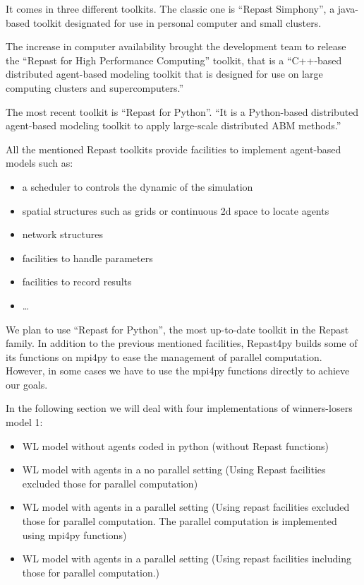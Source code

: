 \documentclass{article}
\providecommand{\tightlist}{%
  \setlength{\itemsep}{0pt}\setlength{\parskip}{0pt}}
\begin{document}
It comes in three different toolkits. 
The classic one is ``Repast Simphony'', a java-based toolkit designated for use in personal computer and small clusters.  

The increase in computer availability brought the development team to release the ``Repast for High Performance Computing'' toolkit, that is a ``C++-based distributed agent-based modeling toolkit that is designed for use on large computing clusters and supercomputers.'' 

The most recent toolkit is ``Repast for Python''. ``It is a Python-based distributed agent-based modeling toolkit to apply large-scale distributed ABM methods.'' 

All the mentioned Repast toolkits provide facilities to implement agent-based models such as:
\begin{itemize}
\tightlist
	\item a scheduler to controls the dynamic of the simulation
	\item spatial structures such as grids or continuous 2d space to locate agents
	\item network structures
	\item facilities to handle parameters
	\item facilities to record results
	\item \ldots
\end{itemize}

We plan to use ``Repast for Python'', the most up-to-date toolkit in the Repast family. In addition to the previous mentioned facilities, Repast4py builds some of its functions on mpi4py to ease the management of parallel computation.
However, in some cases we have to use the mpi4py functions directly to achieve our goals. 

In the following section we will deal with four implementations of winners-losers model 1:
\begin{itemize}
	\item WL model without agents coded in python (without Repast functions)
	\item WL model with agents in a no parallel setting (Using Repast facilities excluded those for parallel computation)
	\item WL model with agents in a parallel setting (Using repast facilities excluded those for parallel computation. The parallel computation is implemented using mpi4py functions)
	\item WL model with agents in a parallel setting (Using repast facilities including those for parallel computation.)
\end{itemize}
\end{document}

